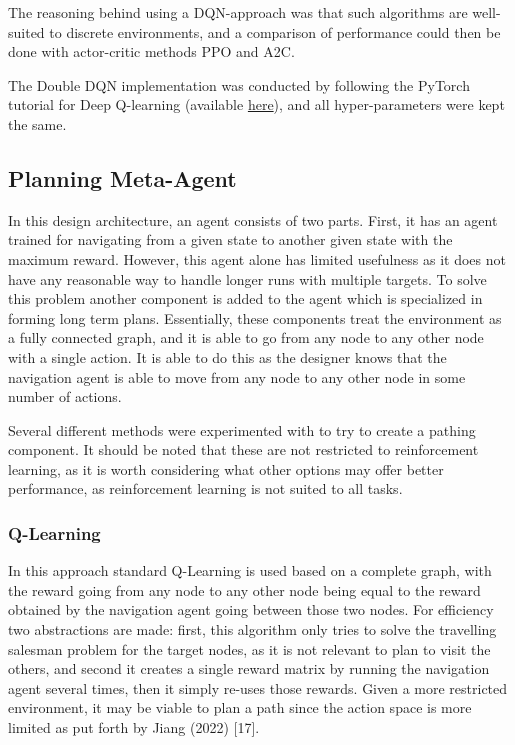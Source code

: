 \documentclass{article}
\begin{document}
	The reasoning behind using a DQN-approach was that such algorithms are well-suited to discrete environments, and a comparison of performance could then be done with actor-critic methods PPO and A2C.
	
	The Double DQN implementation was conducted by following the PyTorch tutorial for Deep Q-learning (available \href{https://pytorch.org/tutorials/intermediate/reinforcement_q_learning.html}{here}), and all hyper-parameters were kept the same.
	
	\subsection{Planning Meta-Agent}
	\label{planning}
	In this design architecture, an agent consists of two parts. First, it has an agent trained for navigating from a given state to another given state with the maximum reward. However, this agent alone has limited usefulness as it does not have any reasonable way to handle longer runs with multiple targets. To solve this problem another component is added to the agent which is specialized in forming long term plans. Essentially, these components treat the environment as a fully connected graph, and it is able to go from any node to any other node with a single action. It is able to do this as the designer knows that the navigation agent is able to move from any node to any other node in some number of actions.
	
	Several different methods were experimented with to try to create a pathing component. It should be noted that these are not restricted to reinforcement learning, as it is worth considering what other options may offer better performance, as reinforcement learning is not suited to all tasks.
	
	\subsubsection{Q-Learning}
	In this approach standard Q-Learning is used based on a complete graph, with the reward going from any node to any other node being equal to the reward obtained by the navigation agent going between those two nodes. For efficiency two abstractions are made: first, this algorithm only tries to solve the travelling salesman problem for the target nodes, as it is not relevant to plan to visit the others, and second it creates a single reward matrix by running the navigation agent several times, then it simply re-uses those rewards. Given a more restricted environment, it may be viable to plan a path since the action space is more limited as put forth by Jiang (2022) [17].
	
\end{document}
